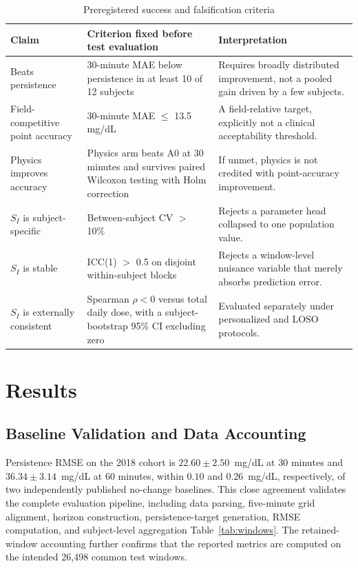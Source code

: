 \documentclass[journal]{IEEEtran}
\begin{document}
\begin{table}[t]
\centering
\caption{Preregistered success and falsification criteria}
\label{tab:falsification}
\footnotesize
\begin{tabular}{p{2.6cm}p{6cm}p{7cm}}
\toprule
Claim & Criterion fixed before test evaluation & Interpretation \\
\midrule
Beats persistence & 30-minute MAE below persistence in at least 10 of 12 subjects & Requires broadly distributed improvement, not a pooled gain driven by a few subjects. \\
Field-competitive point accuracy & 30-minute MAE $\leq$ 13.5 mg/dL & A field-relative target, explicitly not a clinical acceptability threshold. \\
Physics improves accuracy & Physics arm beats A0 at 30 minutes and survives paired Wilcoxon testing with Holm correction & If unmet, physics is not credited with point-accuracy improvement. \\
$S_I$ is subject-specific & Between-subject CV $>$ 10\% & Rejects a parameter head collapsed to one population value. \\
$S_I$ is stable & ICC(1) $>$ 0.5 on disjoint within-subject blocks & Rejects a window-level nuisance variable that merely absorbs prediction error. \\
$S_I$ is externally consistent & Spearman $\rho < 0$ versus total daily dose, with a subject-bootstrap 95\% CI excluding zero & Evaluated separately under personalized and LOSO protocols. \\
\bottomrule
\end{tabular}
\end{table}

\section{Results}

\subsection{Baseline Validation and Data Accounting}

Persistence RMSE on the 2018 cohort is $22.60 \pm 2.50$~mg/dL at 30 minutes and $36.34 \pm 3.14$~mg/dL at 60 minutes, within $0.10$ and $0.26$~mg/dL, respectively, of two independently published no-change baselines\cite{ref56,ref57}. This close agreement validates the complete evaluation pipeline, including data parsing, five-minute grid alignment, horizon construction, persistence-target generation, RMSE computation, and subject-level aggregation Table~\ref{tab:windows}. The retained-window accounting further confirms that the reported metrics are computed on the intended 26,498 common test windows. 
\end{document}
